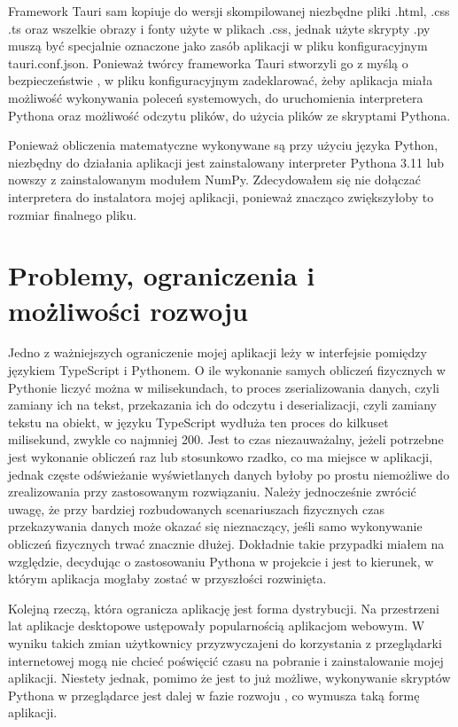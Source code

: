 \documentclass{SGGW-thesis}
\begin{document}
	Framework Tauri sam kopiuje do wersji skompilowanej niezbędne pliki .html, .css .ts oraz wszelkie obrazy i fonty użyte w plikach .css, jednak użyte skrypty .py muszą być specjalnie oznaczone jako zasób aplikacji w pliku konfiguracyjnym tauri.conf.json. Ponieważ twórcy frameworka Tauri stworzyli go z myślą o bezpieczeństwie \cite{about-tauri}, w pliku konfiguracyjnym zadeklarować, żeby aplikacja miała możliwość wykonywania poleceń systemowych, do uruchomienia interpretera Pythona oraz możliwość odczytu plików, do użycia plików ze skryptami Pythona.
	
	Ponieważ obliczenia matematyczne wykonywane są przy użyciu języka Python, niezbędny do działania aplikacji jest zainstalowany interpreter Pythona 3.11 lub nowszy z zainstalowanym modułem NumPy. Zdecydowałem się nie dołączać interpretera do instalatora mojej aplikacji, ponieważ znacząco zwiększyłoby to rozmiar finalnego pliku. 
	\section{Problemy, ograniczenia i możliwości rozwoju}
	Jedno z ważniejszych ograniczenie mojej aplikacji leży w interfejsie pomiędzy językiem TypeScript i Pythonem. O ile wykonanie samych obliczeń fizycznych w Pythonie liczyć można w milisekundach, to proces zserializowania danych, czyli zamiany ich na tekst, przekazania ich do odczytu i deserializacji, czyli zamiany tekstu na obiekt, w języku TypeScript wydłuża ten proces do kilkuset milisekund, zwykle co najmniej 200. Jest to czas niezauważalny, jeżeli potrzebne jest wykonanie obliczeń raz lub stosunkowo rzadko, co ma miejsce w aplikacji, jednak częste odświeżanie wyświetlanych danych byłoby po prostu niemożliwe do zrealizowania przy zastosowanym rozwiązaniu. Należy jednocześnie zwrócić uwagę, że przy bardziej rozbudowanych scenariuszach fizycznych czas przekazywania danych może okazać się nieznaczący, jeśli samo wykonywanie obliczeń fizycznych trwać znacznie dłużej. Dokładnie takie przypadki miałem na względzie, decydując o zastosowaniu Pythona w projekcie i jest to kierunek, w którym aplikacja mogłaby zostać w przyszłości rozwinięta.
	
	Kolejną rzeczą, która ogranicza aplikację jest forma dystrybucji. Na przestrzeni lat aplikacje desktopowe ustępowały popularnością aplikacjom webowym. W wyniku takich zmian użytkownicy przyzwyczajeni do korzystania z przeglądarki internetowej mogą nie chcieć poświęcić czasu na pobranie i zainstalowanie mojej aplikacji. Niestety jednak, pomimo że jest to już możliwe, wykonywanie skryptów Pythona w przeglądarce jest dalej w fazie rozwoju \cite{python-webassembly}, co wymusza taką formę aplikacji.
	
\end{document}
